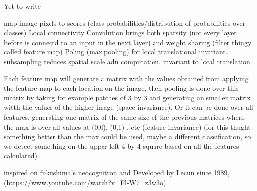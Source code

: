 Yet to write

map image pixels to scores (class probabilities/distribution of probabilities over classes)
Local connectivity Convolution brings both sparsity )not every layer before is connectd to an input in the next layer) and weight sharing (filter thingy called feature map)
Poling (max'pooling) for local translational invariant. subsampling reduces spatial scale adn computation. invariant to local translation.

Each feature map will generate a matrix with the values obtained from applying the feature map to each location on the image, then pooling is done over this matrix by taking for example patches of 3 by 3 and generating an smaller matrix witth the values of the higher image (space invariance). Or it can be done over all features, generating one matrix of the same size of the previous matrices where the max is over all values at (0,0), (0,1) , etc (feature invariance) (for this thught something better than the max could be used, maybe a different classification, so we detect something on the upper left 4 by 4 square based on all the features calculated).

inspired on fukushima's neocognitron and Developed by Lecun since 1989, (https://www.youtube.com/watch?v=Fl-W7_z3w3o).

